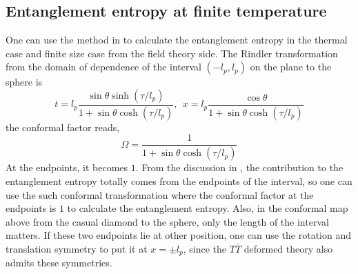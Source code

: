 \documentclass[11pt,a4paper,utf8]{article}
\begin{document}
\subsection{Entanglement entropy at finite temperature}

\newcommand{\lp}{\ensuremath{l_p}}
\newcommand{\halfL}{\ensuremath{\frac{L}{2}}}

	One can use the method in \cite{Lewkowycz:2019xse} to calculate the entanglement entropy in the thermal case and finite size case from the field theory side. The Rindler transformation from the domain of dependence of the interval $(-\lp,\lp)$ on the plane to the sphere is
	\begin{equation}
	t=\lp\frac{\sin\theta \sinh(\tau/\lp)}{1+\sin\theta \cosh(\tau/\lp)},\ \  x=\lp\frac{\cos\theta}{1+\sin\theta\cosh(\tau/\lp)}
	\label{eq:rindler_sphere}
	\end{equation}
	the conformal factor reads,
	\begin{equation}
	\Omega=\frac{1}{1+\sin\theta\cosh(\tau/\lp)}
	\end{equation}
	At the endpoints, it becomes $1$. From the discussion in \cite{Lewkowycz:2019xse}, the contribution to the entanglement entropy totally comes from the endpoints of the interval, so one can use the such conformal transformation where the conformal factor at the endpoints is $1$ to calculate the entanglement entropy. Also, in the conformal map above from the casual diamond to the sphere, only the length of the interval matters. If these two endpoints lie at other position, one can use the rotation and translation symmetry to put it at $x = \pm \lp$, since the $T\bar T$ deformed theory also admits these symmetries. 
	
\end{document}
